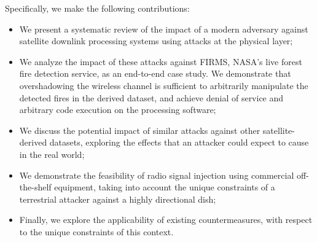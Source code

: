 Specifically, we make the following contributions:

\begin{itemize}
    \item We present a systematic review of the impact of a modern adversary against satellite downlink processing systems using attacks at the physical layer;
    \item We analyze the impact of these attacks against FIRMS, NASA's live forest fire detection service, as an end-to-end case study. We demonstrate that overshadowing the wireless channel is sufficient to arbitrarily manipulate the detected fires in the derived dataset, and achieve denial of service and arbitrary code execution on the processing software;
    \item We discuss the potential impact of similar attacks against other satellite-derived datasets, exploring the effects that an attacker could expect to cause in the real world;
    \item We demonstrate the feasibility of radio signal injection using commercial off-the-shelf equipment, taking into account the unique constraints of a terrestrial attacker against a highly directional dish;
    \item Finally, we explore the applicability of existing countermeasures, with respect to the unique constraints of this context.
\end{itemize}





